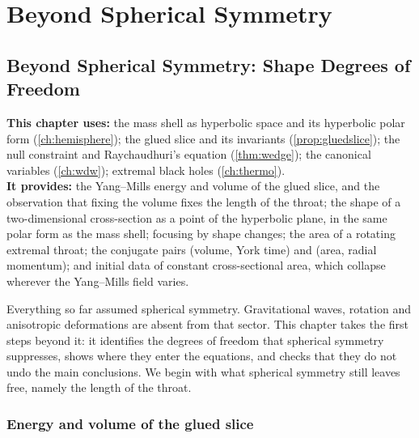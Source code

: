 \part{Beyond Spherical Symmetry}
\chapter{Beyond Spherical Symmetry: Shape Degrees of Freedom}
\label{ch:shape}

\begin{usesbox}
\textbf{This chapter uses:} the mass shell as hyperbolic space and its hyperbolic polar form (\cref{ch:hemisphere}); the glued slice and its invariants (\cref{prop:gluedslice}); the null constraint and Raychaudhuri's equation (\cref{thm:wedge}); the canonical variables (\cref{ch:wdw}); extremal black holes (\cref{ch:thermo}).\\
\textbf{It provides:} the Yang--Mills energy and volume of the glued slice, and the observation that fixing the volume fixes the length of the throat; the shape of a two-dimensional cross-section as a point of the hyperbolic plane, in the same polar form as the mass shell; focusing by shape changes; the area of a rotating extremal throat; the conjugate pairs (volume, York time) and (area, radial momentum); and initial data of constant cross-sectional area, which collapse wherever the Yang--Mills field varies.
\end{usesbox}

Everything so far assumed spherical symmetry. Gravitational waves, rotation and anisotropic deformations are absent from that sector. This chapter takes the first steps beyond it: it identifies the degrees of freedom that spherical symmetry suppresses, shows where they enter the equations, and checks that they do not undo the main conclusions. We begin with what spherical symmetry still leaves free, namely the length of the throat.

\section{Energy and volume of the glued slice}

